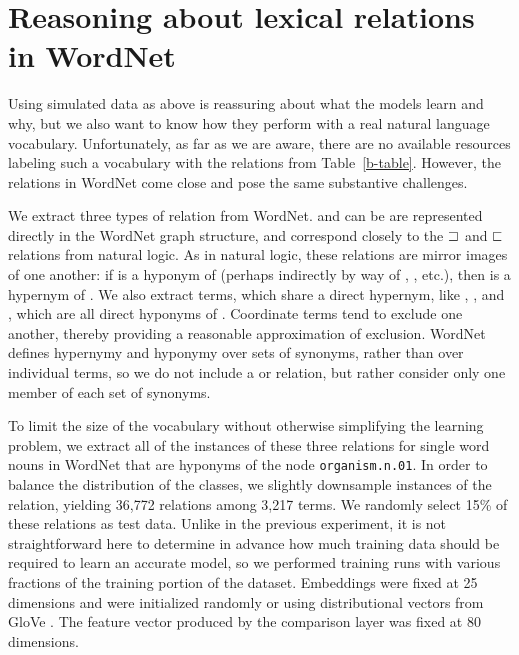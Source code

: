 \section{Reasoning about lexical relations in WordNet}\label{sec:wordnet}

Using simulated data as above is reassuring about what the models
learn and why, but we also want to know how they perform with a real
natural language vocabulary. Unfortunately, as far as we are aware,
there are no available resources labeling such a vocabulary with the
relations from Table~\ref{b-table}. However, the relations in WordNet
\cite{fellbaum2010wordnet} come close and pose the same substantive
challenges.


We extract three types of relation from WordNet.  and
 can be are represented directly in the WordNet graph
structure, and correspond closely to the $\sqsupset$ and $\sqsubset$
relations from natural logic. As in natural logic, these relations are
mirror images of one another: if  is a hyponym of 
(perhaps indirectly by way of , , etc.), then
 is a hypernym of . We also extract 
terms, which share a direct hypernym, like , ,
and , which are all direct hyponyms of .  Coordinate
terms tend to exclude one another, thereby providing a reasonable
approximation of exclusion. WordNet defines hypernymy and hyponymy over
sets of synonyms, rather than over individual terms, so we do not
include a  or  relation, but rather
consider only one member of each set of synonyms.

To limit the size of the vocabulary without otherwise simplifying the learning problem, we extract all of the
instances of these three relations for single word nouns in WordNet that are hyponyms of the node 
\texttt{organism.n.01}. In order to balance the distribution of the classes, we slightly downsample instances 
of the  relation, yielding 36,772 relations among 3,217 terms. We randomly select 15\% of these 
relations as test data. Unlike in the previous experiment, it is not straightforward here to determine in advance
 how much training data should be required to learn an accurate model, so we performed training runs with 
 various fractions of the training portion of the 
dataset. Embeddings were fixed at 25 dimensions and were initialized randomly or using distributional 
vectors from GloVe \cite{pennington2014glove}. The feature vector produced by the comparison layer was fixed at 
80 dimensions.

